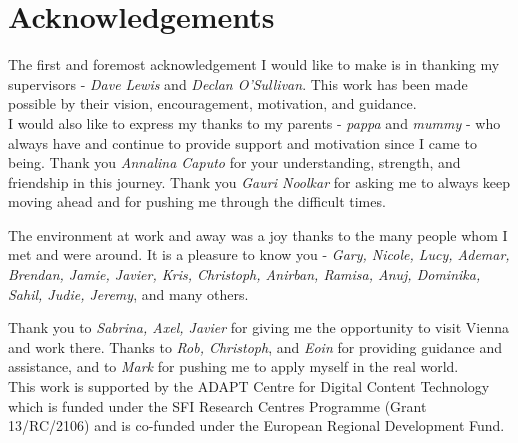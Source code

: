\chapter*{Acknowledgements}

The first and foremost acknowledgement I would like to make is in thanking my supervisors - \textit{Dave Lewis} and \textit{Declan O'Sullivan}. This work has been made possible by their vision, encouragement, motivation, and guidance. \\ [10mm]

I would also like to express my thanks to my parents - \textit{pappa} and \textit{mummy} - who always have and continue to provide support and motivation since I came to being.
Thank you \textit{Annalina Caputo} for your understanding, strength, and friendship in this journey.
Thank you \textit{Gauri Noolkar} for asking me to always keep moving ahead and for pushing me through the difficult times.

The environment at work and away was a joy thanks to the many people whom I met and were around. It is a pleasure to know you - \textit{Gary, Nicole, Lucy, Ademar, Brendan, Jamie, Javier, Kris, Christoph, Anirban, Ramisa, Anuj, Dominika, Sahil, Judie, Jeremy}, and many others. 

Thank you to \textit{Sabrina, Axel, Javier} for giving me the opportunity to visit Vienna and work there. Thanks to \textit{Rob, Christoph}, and \textit{Eoin} for providing guidance and assistance, and to \textit{Mark} for pushing me to apply myself in the real world. \\[10mm]

This work is supported by the ADAPT Centre for Digital Content Technology which is funded under the SFI Research Centres Programme (Grant 13/RC/2106) and is co-funded under the European Regional Development Fund.
